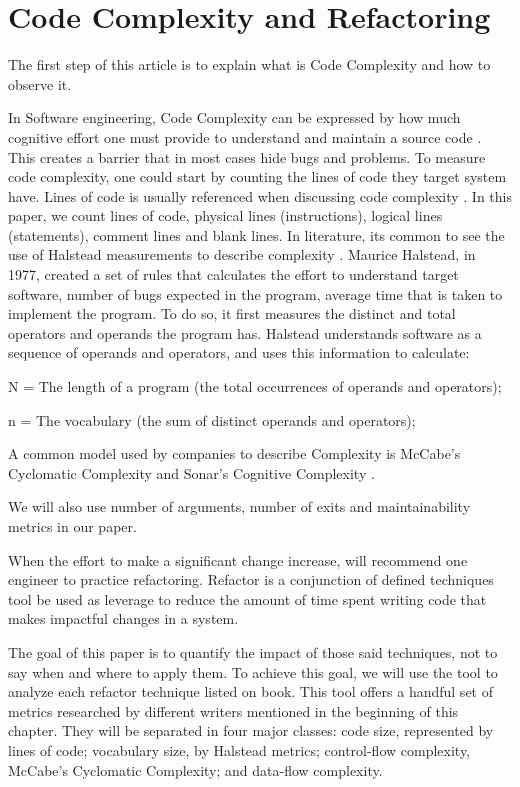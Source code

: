 \section{Code Complexity and Refactoring}

The first step of this article is to explain what is Code Complexity and how to observe it.

In Software engineering, Code Complexity can be expressed by how much cognitive effort one must provide to understand
and maintain a source code \cite{article:fmricc}. This creates a barrier that in most cases hide bugs and problems.
To measure code complexity, one could start by counting the lines of code they target system have. Lines of code is usually
referenced when discussing code complexity \cite{article:rustcc}. In this paper, we count lines of code, physical lines (instructions),
logical lines (statements), comment lines and blank lines.
In literature, its common to see the use of Halstead measurements to describe complexity \cite{article:complexity_with_halstead}.
Maurice Halstead, in 1977, created a set of rules that calculates the effort to understand target software, number of bugs
expected in the program, average time that is taken to implement the program. To do so, it first measures the distinct and total
operators and operands the program has. Halstead understands software as a sequence of operands and operators, and uses
this information to calculate:

N = The length of a program (the total occurrences of operands and operators);

n = The vocabulary (the sum of distinct operands and operators);


A common model used by companies to describe Complexity is McCabe's Cyclomatic Complexity and Sonar's Cognitive Complexity
\cite{article:sonarpaper}.

We will also use number of arguments, number of exits and maintainability metrics in our paper.


When the effort to make a significant change increase, \cite{book:refactoring} will recommend one engineer to practice
refactoring. Refactor is a conjunction of defined techniques tool be used as leverage to reduce the amount of time spent
writing code that makes impactful changes in a system.

The goal of this paper is to quantify the impact of those said techniques, not to say when and where to apply them.
To achieve this goal, we will use the \cite{article:mozilla} tool to analyze each refactor technique listed on
\cite{book:refactoring} book. This tool offers a handful set of metrics researched by
different writers mentioned in the beginning of this chapter. They will be separated in four major classes: code size,
represented by lines of code; vocabulary size, by Halstead metrics; control-flow complexity, McCabe's Cyclomatic
Complexity; and data-flow complexity.
